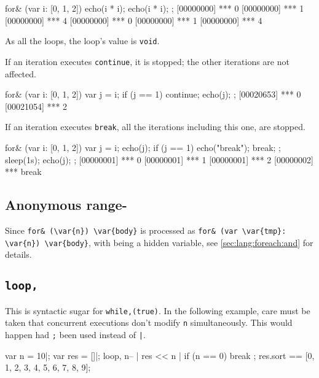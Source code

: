 \begin{urbiscript}
for& (var i: [0, 1, 2])
{
  echo(i * i);
  echo(i * i);
};
[00000000] *** 0
[00000000] *** 1
[00000000] *** 4
[00000000] *** 0
[00000000] *** 1
[00000000] *** 4
\end{urbiscript}

As all the loops, the loop's value is \lstinline|void|.

If an iteration executes \lstinline{continue}, it is stopped; the
other iterations are not affected.

\begin{urbiscript}
for& (var i: [0, 1, 2])
{
  var j = i;
  if (j == 1)
    continue;
  echo(j);
};
[00020653] *** 0
[00021054] *** 2
\end{urbiscript}

If an iteration executes \lstinline{break}, all the iterations
including this one, are stopped.

\begin{urbiscript}
for& (var i: [0, 1, 2])
{
  var j = i;
  echo(j);
  if (j == 1)
  {
    echo("break");
    break;
  };
  sleep(1s);
  echo(j);
};
[00000001] *** 0
[00000001] *** 1
[00000001] *** 2
[00000002] *** break
\end{urbiscript}

\subsection{Anonymous range-\forAnd}
\label{sec:lang:forn:and}

Since \lstinline|for& (\var{n}) \var{body}| is processed as
\lstinline|for& (var \var{tmp}: \var{n}) \var{body}|, with  being a
hidden variable, see \autoref{sec:lang:foreach:and} for details.


\subsection{\lstinline{loop,}}
\label{sec:lang:loop:comma}
\experimentalremoved{}

This is syntactic sugar for \lstinline|while,(true)|.  In the following
example, care must be taken that concurrent executions don't modify
\lstinline{n} simultaneously.  This would happen had \lstinline|;| been used
instead of \lstinline'|'.

\begin{urbiassert}
{
  var n = 10|;
  var res = []|;
  loop,
  {
    n-- |
    res << n |
    if (n == 0)
      break
  };
  res.sort
}
==
[0, 1, 2, 3, 4, 5, 6, 7, 8, 9];
\end{urbiassert}

